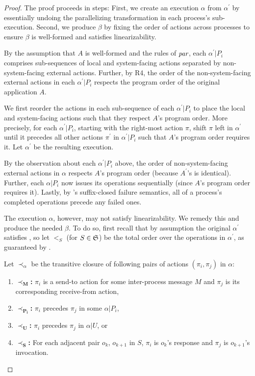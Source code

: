 \begin{proof}
The proof proceeds in steps: First, we create an execution $\alpha$ from
$\alpha^\prime$ by essentially undoing the parallelizing transformation in
each process's sub-execution. Second, we produce $\beta$ by fixing the order
of actions across processes to ensure $\beta$ is well-formed and satisfies linearizability.

By the assumption that $A$ is well-formed and the rules of $\operatorname*{\textit{par}}$,
each $\alpha^\prime | P_i$ comprises sub-sequences of local and
system-facing actions separated by non-system-facing external actions.
Further, by R4, the order of the non-system-facing external
actions in each $\alpha^\prime | P_i$ respects the program order of the
original application $A$. 

We first reorder the actions in each sub-sequence of each $\alpha^\prime | P_i$
to place the local and system-facing actions such that they respect $A$'s program
order. More precisely, for each $\alpha^\prime | P_i$, starting with the right-most
action $\pi$, shift $\pi$ left in $\alpha^\prime$ until it precedes
all other actions $\pi^\prime$ in $\alpha^\prime | P_i$ such that $A$'s program
order requires it. Let $\alpha^\prime$ be the resulting execution.

By the observation about each $\alpha^\prime | P_i$ above, the order of
non-system-facing external actions in $\alpha$ respects $A$'s program order
(because $A^\prime$'s is identical). Further, each $\alpha | P_i$ now
issues its operations sequentially (since $A$'s program order requires it).
Lastly, by \MDL{}'s suffix-closed failure semantics, all of a process's 
completed operations precede any failed ones.

The execution $\alpha$, however, may not satisfy linearizability. We remedy this
and produce the needed $\beta$. To do so, first recall that by assumption the 
original  $\alpha^\prime$ satisfies \MDL{}, so let $<_S$ (for $S \in \mathfrak{S}$) be the total order over the operations in $\alpha^\prime$, as guaranteed by \MDL{}.

Let $\prec_{\alpha}$ be the transitive closure of following pairs of actions
$(\pi_i, \pi_j)$ in $\alpha$:
\begin{enumerate}
    \item $\mathbf{\prec_M}$\textbf{:} $\pi_i$ is a send-to action for some
    inter-process message $M$ and $\pi_j$ is its corresponding receive-from action,
    \item $\mathbf{\prec_{P_i}}$\textbf{:} $\pi_i$ precedes $\pi_j$ in some $\alpha | P_i$,
    \item $\mathbf{\prec_U}$\textbf{:} $\pi_i$ precedes $\pi_j$ in $\alpha | U$, or
    \item $\mathbf{\prec_S}$\textbf{:} For each adjacent pair $o_k$, $o_{k+1}$
    in $S$, $\pi_i$ is $o_k$'s response and $\pi_j$ is $o_{k+1}$'s invocation.
\end{enumerate}


\end{proof}
